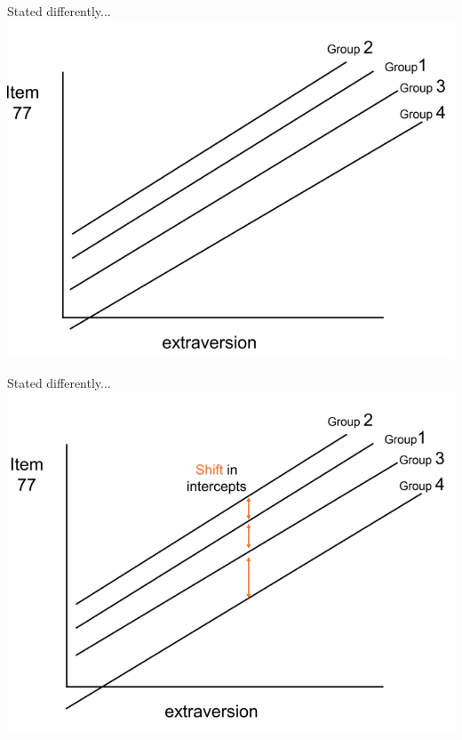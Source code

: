 \documentclass[10pt]{beamer}\usepackage[]{graphicx}\usepackage[]{xcolor}
\begin{document}
\begin{frame}{Stated differently...}
    \includegraphics[height=0.8\textheight,keepaspectratio]{images/slide108.png}
\end{frame}

\begin{frame}{Stated differently...}
    \includegraphics[height=0.8\textheight,keepaspectratio]{images/slide109.png}
\end{frame}
\end{document}
